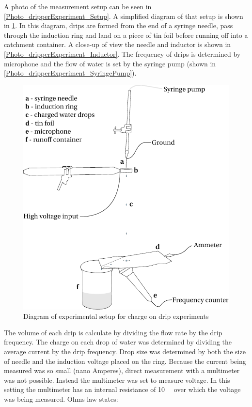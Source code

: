 A photo of the measurement setup can be seen in \cref{Photo_dripperExperiment_Setup}.
A simplified diagram of that setup is shown in \cref{ChargedDrips_Figure_Drawing_ExperimentalSetup}.
In this diagram, drips are formed from the end of a syringe needle, pass through the induction ring and land on a piece of tin foil before running off into a catchment container.
A close-up of view the needle and inductor is shown in \cref{Photo_dripperExperiment_Inductor}.
The frequency of drips is determined by microphone and the flow of water is set by the syringe pump (shown in \cref{Photo_dripperExperiment_SyringePump}).

\begin{figure}
    \centering
    \includegraphics[scale=0.9]{content/appendices/chargedWaterDrops/graphics/ChargedDrips_Figure_Drawing_ExperimentalSetup}
    \caption{\label{ChargedDrips_Figure_Drawing_ExperimentalSetup}Diagram of experimental
    setup for charge on drip experiments}
\end{figure}

The volume of each drip is calculate by dividing the flow rate by the drip frequency.
The charge on each drop of water was determined by dividing the average current by the drip frequency.
Drop size was determined by both the size of needle and the induction voltage placed on the ring.
Because the current being measured was so small (nano Amperes), direct measurement with a multimeter was not possible.
Instead the multimeter was set to measure voltage.
In this setting the multimeter has an internal resistance of \SI{10}{\mega\Omega} over which the voltage was being measured.
Ohms law states:

